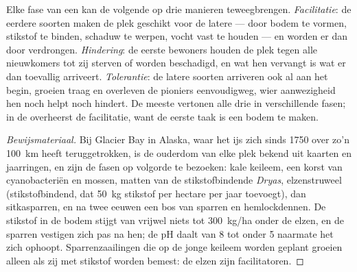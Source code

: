 \begin{proposition}\label{prop:b1:ecosystem-dynamics:mechanisms}
Elke fase van een  kan de volgende op drie manieren teweegbrengen.
\emph{Facilitatie}: de eerdere soorten maken de plek geschikt voor de latere
--- door bodem te vormen, stikstof te binden, schaduw te werpen, vocht vast
te houden --- en worden er dan door verdrongen. \emph{Hindering}: de eerste
bewoners houden de plek tegen alle nieuwkomers tot zij sterven of worden
beschadigd, en wat hen vervangt is wat er dan toevallig arriveert.
\emph{Tolerantie}: de latere soorten arriveren ook al aan het begin, groeien
traag en overleven de pioniers eenvoudigweg, wier aanwezigheid hen noch
helpt noch hindert. De meeste  vertonen alle drie in verschillende
fasen; in de  overheerst de facilitatie, want de eerste
taak is een bodem te maken.
\end{proposition}
\begin{proof}[Bewijsmateriaal]
Bij Glacier Bay in Alaska, waar het ijs zich sinds 1750 over zo'n
\qty{100}{km} heeft teruggetrokken, is de ouderdom van elke plek bekend uit kaarten en
jaarringen, en zijn de fasen op volgorde te bezoeken: kale keileem, een
korst van cyanobacteriën en mossen, matten van de stikstofbindende
\emph{Dryas}, elzenstruweel (stikstofbindend, dat \qty{50}{kg} stikstof per
hectare per jaar toevoegt), dan sitkasparren, en na twee eeuwen een bos van
sparren en hemlockdennen. De stikstof in de bodem stijgt van vrijwel niets
tot \qty{300}{kg/ha} onder de elzen, en de sparren vestigen zich pas na hen;
de pH daalt van 8 tot onder 5 naarmate het  zich ophoopt.
Sparrenzaailingen die op de jonge keileem worden geplant groeien alleen als
zij met stikstof worden bemest: de elzen zijn facilitatoren.
\end{proof}

